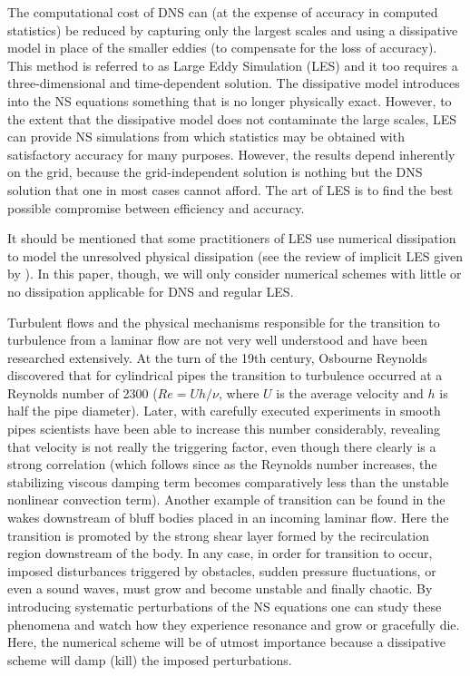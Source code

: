 The computational cost of DNS can (at the expense of accuracy in
computed statistics) be reduced by capturing only the largest scales
and using a dissipative model in place of the smaller eddies (to
compensate for the loss of accuracy). This method is referred to as
Large Eddy Simulation (LES) and it too requires a three-dimensional
and time-dependent solution. The dissipative model introduces into the
NS equations something that is no longer physically exact. However,
to the extent that the dissipative model does not contaminate the
large scales, LES can provide NS simulations from which statistics
may be obtained with satisfactory accuracy for many purposes. However,
the results depend inherently on the grid, because the grid-independent
solution is nothing but the DNS solution that one in most cases cannot
afford. The art of LES is to find the best possible compromise
between efficiency and accuracy.

It should be mentioned that some practitioners of LES use numerical
dissipation to model the unresolved physical dissipation (see the review
of implicit LES given by \citet{Iles}). In this paper, though, we will
only consider numerical schemes with little or no dissipation
applicable for DNS and regular LES.

Turbulent flows and the physical mechanisms responsible for the transition
to turbulence from a laminar flow are not very well understood and have
been researched extensively. At the turn of the
19th century, Osbourne Reynolds discovered that for cylindrical pipes
the transition to turbulence occurred at a Reynolds number of 2300
($Re = Uh/\nu$, where $U$ is the average velocity and $h$ is half
the pipe diameter). Later, with carefully executed experiments in
smooth pipes scientists have been able to increase this number
considerably, revealing that velocity is not really the triggering factor,
even though there clearly is a strong correlation (which follows since as the
Reynolds number increases, the stabilizing viscous damping term becomes
comparatively less than the unstable nonlinear convection term). Another
example of transition can be found in the wakes downstream of bluff bodies
placed in an incoming laminar flow. Here the transition is promoted by the
strong shear layer formed by the recirculation region downstream of the body. In any
case, in order for transition to occur, imposed disturbances triggered
by obstacles, sudden pressure fluctuations, or even a sound waves, must
grow and become unstable and finally chaotic. By introducing systematic
perturbations of the NS equations one can study these phenomena and
watch how they experience resonance and grow or gracefully die. Here,
the numerical scheme will be of utmost importance
because a dissipative scheme will damp (kill) the imposed perturbations.

